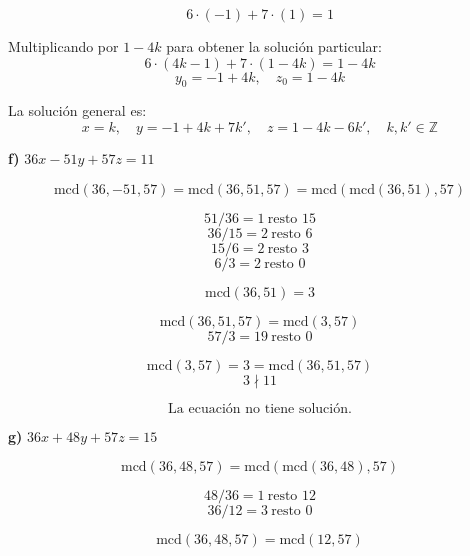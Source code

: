 \documentclass[a4paper,12pt]{article}
\begin{document}
\begin{ejercicio}[title=Ejercicio 9]

\[
6\cdot(-1) + 7\cdot(1) = \boxed{1}
\]

Multiplicando por $1-4k$ para obtener la solución particular:
\[
6 \cdot (4k-1) + 7 \cdot (1-4k) = 1-4k
\]
\[
y_0 = -1 + 4k, \quad z_0 = 1 - 4k
\]

La solución general es:
\[
\boxed{
x = k, \quad y = -1 + 4k + 7k', \quad z = 1 - 4k - 6k', \quad k, k' \in \mathbb{Z}
}
\]

\textbf{f) } $36x - 51y + 57z = 11$

\vspace{0.5em}

\[
\text{mcd}(36,-51,57) = \text{mcd}(36,51,57) = \text{mcd}(\text{mcd}(36,51),57)
\]

\[
51 / 36 = 1 \ \text{resto } 15
\]
\[
36 / 15 = 2 \ \text{resto } 6
\]
\[
15 / 6 = 2 \ \text{resto } \boxed{3}
\]
\[
6 / 3 = 2 \ \text{resto } 0
\]

\[
\text{mcd}(36,51) = \boxed{3}
\]

\[
\text{mcd}(36,51,57) = \text{mcd}(3,57)
\]
\[
57 / \boxed{3} = 19 \ \text{resto } 0
\]

\[
\text{mcd}(3,57) = 3 = \text{mcd}(36,51,57)
\]
\[
3 \nmid 11
\]

\[
\boxed{\text{La ecuación no tiene solución.}}
\]

\textbf{g) } $36x + 48y + 57z = 15$

\vspace{0.5em}

\[
\text{mcd}(36,48,57) = \text{mcd}(\text{mcd}(36,48),57)
\]

\[
48 / 36 = 1 \ \text{resto } \boxed{12}
\]
\[
36 / 12 = 3 \ \text{resto } 0
\]

\[
\text{mcd}(36,48,57) = \text{mcd}(12,57)
\]

\end{ejercicio}
\end{document}
